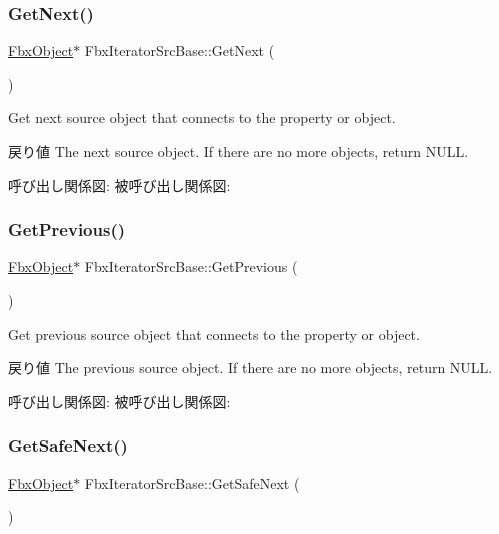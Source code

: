 \subsubsection{\texorpdfstring{Get\+Next()}{GetNext()}}
{\footnotesize\ttfamily \hyperlink{class_fbx_object}{Fbx\+Object}$\ast$ Fbx\+Iterator\+Src\+Base\+::\+Get\+Next (\begin{DoxyParamCaption}{ }\end{DoxyParamCaption})}

Get next source object that connects to the property or object. \begin{DoxyReturn}{戻り値}
The next source object. If there are no more objects, return N\+U\+LL. 
\end{DoxyReturn}
呼び出し関係図\+:
被呼び出し関係図\+:
\mbox{\label{class_fbx_iterator_src_base_a953061817a99a4440f964ae584dcb0b5}} 
\subsubsection{\texorpdfstring{Get\+Previous()}{GetPrevious()}}
{\footnotesize\ttfamily \hyperlink{class_fbx_object}{Fbx\+Object}$\ast$ Fbx\+Iterator\+Src\+Base\+::\+Get\+Previous (\begin{DoxyParamCaption}{ }\end{DoxyParamCaption})}

Get previous source object that connects to the property or object. \begin{DoxyReturn}{戻り値}
The previous source object. If there are no more objects, return N\+U\+LL. 
\end{DoxyReturn}
呼び出し関係図\+:
被呼び出し関係図\+:
\mbox{\label{class_fbx_iterator_src_base_ad0bb49ec584418f0325bc4f05a21ed04}} 
\subsubsection{\texorpdfstring{Get\+Safe\+Next()}{GetSafeNext()}}
{\footnotesize\ttfamily \hyperlink{class_fbx_object}{Fbx\+Object}$\ast$ Fbx\+Iterator\+Src\+Base\+::\+Get\+Safe\+Next (\begin{DoxyParamCaption}{ }\end{DoxyParamCaption})}

